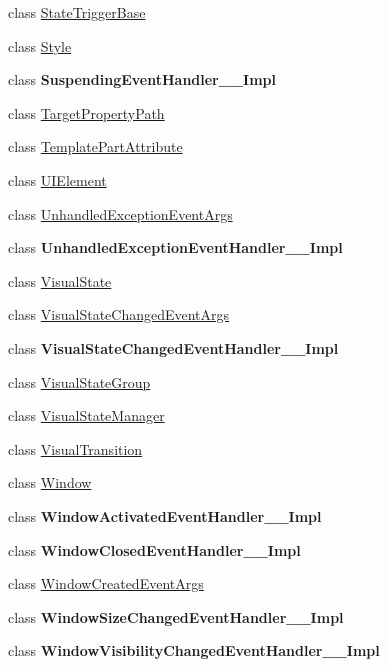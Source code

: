 \begin{DoxyCompactItemize}
\item 
class \hyperlink{class_windows_1_1_u_i_1_1_xaml_1_1_state_trigger_base}{State\+Trigger\+Base}
\item 
class \hyperlink{class_windows_1_1_u_i_1_1_xaml_1_1_style}{Style}
\item 
class {\bfseries Suspending\+Event\+Handler\+\_\+\+\_\+\+Impl}
\item 
class \hyperlink{class_windows_1_1_u_i_1_1_xaml_1_1_target_property_path}{Target\+Property\+Path}
\item 
class \hyperlink{class_windows_1_1_u_i_1_1_xaml_1_1_template_part_attribute}{Template\+Part\+Attribute}
\item 
class \hyperlink{class_windows_1_1_u_i_1_1_xaml_1_1_u_i_element}{U\+I\+Element}
\item 
class \hyperlink{class_windows_1_1_u_i_1_1_xaml_1_1_unhandled_exception_event_args}{Unhandled\+Exception\+Event\+Args}
\item 
class {\bfseries Unhandled\+Exception\+Event\+Handler\+\_\+\+\_\+\+Impl}
\item 
class \hyperlink{class_windows_1_1_u_i_1_1_xaml_1_1_visual_state}{Visual\+State}
\item 
class \hyperlink{class_windows_1_1_u_i_1_1_xaml_1_1_visual_state_changed_event_args}{Visual\+State\+Changed\+Event\+Args}
\item 
class {\bfseries Visual\+State\+Changed\+Event\+Handler\+\_\+\+\_\+\+Impl}
\item 
class \hyperlink{class_windows_1_1_u_i_1_1_xaml_1_1_visual_state_group}{Visual\+State\+Group}
\item 
class \hyperlink{class_windows_1_1_u_i_1_1_xaml_1_1_visual_state_manager}{Visual\+State\+Manager}
\item 
class \hyperlink{class_windows_1_1_u_i_1_1_xaml_1_1_visual_transition}{Visual\+Transition}
\item 
class \hyperlink{class_windows_1_1_u_i_1_1_xaml_1_1_window}{Window}
\item 
class {\bfseries Window\+Activated\+Event\+Handler\+\_\+\+\_\+\+Impl}
\item 
class {\bfseries Window\+Closed\+Event\+Handler\+\_\+\+\_\+\+Impl}
\item 
class \hyperlink{class_windows_1_1_u_i_1_1_xaml_1_1_window_created_event_args}{Window\+Created\+Event\+Args}
\item 
class {\bfseries Window\+Size\+Changed\+Event\+Handler\+\_\+\+\_\+\+Impl}
\item 
class {\bfseries Window\+Visibility\+Changed\+Event\+Handler\+\_\+\+\_\+\+Impl}
\end{DoxyCompactItemize}
